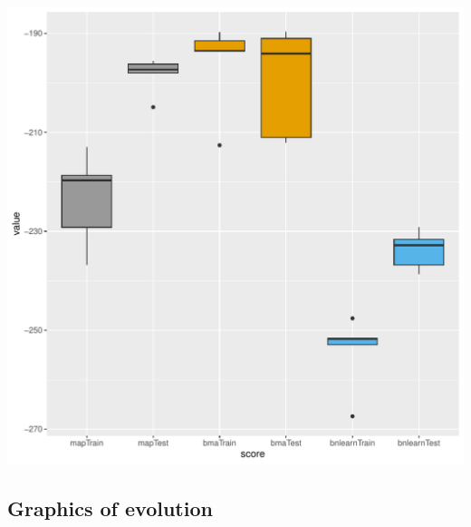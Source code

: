 \documentclass[]{scrartcl}
\begin{document}
\includegraphics[scale = 0.5]{./figs/asia/asia-boxplots.pdf}

\subsection{Graphics of evolution}
\end{document}
